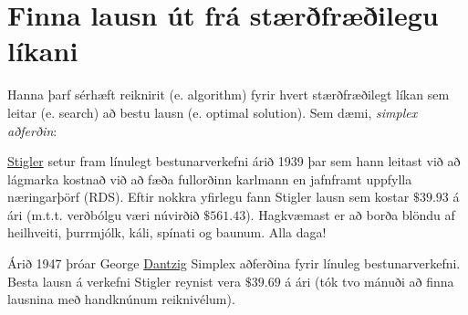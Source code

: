 \section{Finna lausn út frá stærðfræðilegu líkani}
 
Hanna þarf sérhæft reiknirit (e. algorithm) fyrir hvert stærðfræðilegt líkan sem leitar (e. search) að bestu lausn (e. optimal solution). Sem dæmi, \emph{simplex aðferðin}: 
 
 
\href{http://en.wikipedia.org/wiki/George_Stigler}{Stigler} setur fram línulegt bestunarverkefni árið 1939 þar sem hann leitast við að lágmarka kostnað við að fæða fullorðinn karlmann en jafnframt uppfylla næringarþörf (RDS). Eftir nokkra yfirlegu fann Stigler lausn sem kostar $\$39.93$ á ári (m.t.t. verðbólgu væri núvirðið $\$561.43$). Hagkvæmast er að borða blöndu af heilhveiti, þurrmjólk, káli, spínati og baunum. Alla daga! 

Árið 1947 þróar George \href{http://en.wikipedia.org/wiki/George_Dantzig}{Dantzig} Simplex aðferðina fyrir línuleg bestunarverkefni. Besta lausn á verkefni Stigler reynist vera $\$39.69$ á ári (tók tvo mánuði að finna lausnina með handknúnum reiknivélum).


